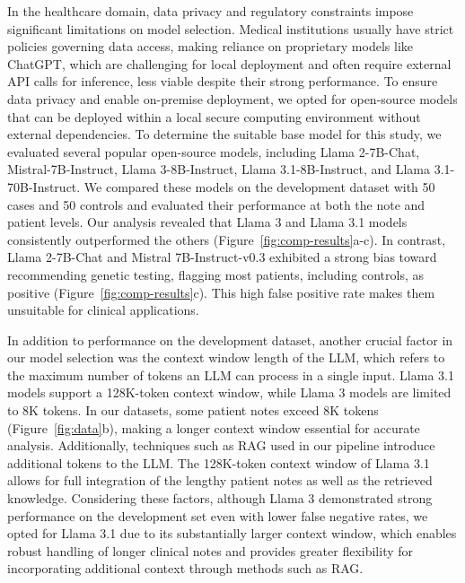 \documentclass[fleqn,10pt]{wlscirep}
\begin{document}
In the healthcare domain, data privacy and regulatory constraints impose significant limitations on model selection. Medical institutions usually have strict policies governing data access, making reliance on proprietary models like ChatGPT, which are challenging for local deployment and often require external API calls for inference, less viable despite their strong performance. To ensure data privacy and enable on-premise deployment, we opted for open-source models that can be deployed within a local secure computing environment without external dependencies. To determine the suitable base model for this study, we evaluated several popular open-source models, including Llama 2-7B-Chat,\cite{touvron2023llama} Mistral-7B-Instruct,\cite{Jiang2023Mistral7} Llama 3-8B-Instruct, Llama 3.1-8B-Instruct, and Llama 3.1-70B-Instruct.\cite{grattafiori2024llama} We compared these models on the development dataset with 50 cases and 50 controls and evaluated their performance at both the note and patient levels. Our analysis revealed that Llama 3 and Llama 3.1 models consistently outperformed the others (Figure~\ref{fig:comp-results}a-c). In contrast, Llama 2-7B-Chat and Mistral 7B-Instruct-v0.3 exhibited a strong bias toward recommending genetic testing, flagging most patients, including controls, as positive (Figure~\ref{fig:comp-results}c). This high false positive rate makes them unsuitable for clinical applications.

In addition to performance on the development dataset, another crucial factor in our model selection was the context window length of the LLM, which refers to the maximum number of tokens an LLM can process in a single input. Llama 3.1 models support a 128K-token context window, while Llama 3 models are limited to 8K tokens. In our datasets, some patient notes exceed 8K tokens (Figure~\ref{fig:data}b), making a longer context window essential for accurate analysis. Additionally, techniques such as RAG used in our pipeline introduce additional tokens to the LLM. The 128K-token context window of Llama 3.1 allows for full integration of the lengthy patient notes as well as the retrieved knowledge. Considering these factors, although Llama 3 demonstrated strong performance on the development set even with lower false negative rates, we opted for Llama 3.1 due to its substantially larger context window, which enables robust handling of longer clinical notes and provides greater flexibility for incorporating additional context through methods such as RAG.
\end{document}
